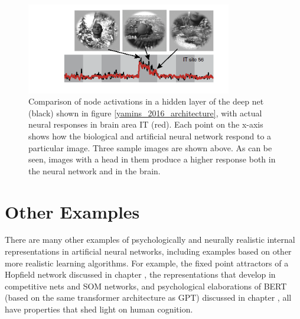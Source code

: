 \begin{figure}[h]
\centering
\includegraphics[width=0.8\textwidth]{images/deepNetYaminsITResponses_2016.png}
\caption[Yamins.]{Comparison of node activations in a hidden layer of the deep net (black) shown in figure \ref{yamins_2016_architecture}, with actual neural responses in brain area IT (red). Each point on the x-axis shows how the biological and artificial neural network respond to a particular image. Three sample images are shown above. As can be seen, images with a head in them produce a higher response both in the neural network and in the brain.}
\label{yamins_2016_responses}
\end{figure}


\section{Other Examples}

There are many other examples of psychologically and neurally realistic internal representations  in artificial neural networks, including examples based on other more realistic learning algorithms. For example, the fixed point attractors of a Hopfield network discussed in chapter , the representations that develop in competitive nets and SOM networks, and psychological elaborations of BERT  (based on the same transformer architecture as GPT) discussed in chapter , all have properties that shed light on human cognition. 


